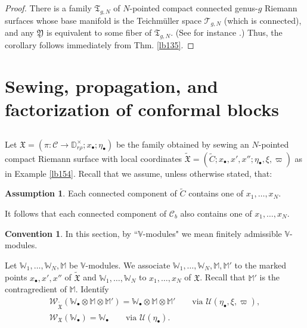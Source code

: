 \documentclass[12pt,a4paper,notitlepage]{article}
\theoremstyle{definition}
\newtheorem{ass}[df]{Assumption}
\newtheorem{cv}[df]{Convention}
\theoremstyle{plain}
\newcommand{\fk}{\mathfrak}
\newcommand{\mc}{\mathcal}
\newcommand{\wtd}{\widetilde}
\newcommand{\scr}{\mathscr}
\newcommand{\blt}{\bullet}
\newcommand{\Vbb}{\mathbb V}
\newcommand{\Wbb}{\mathbb W}
\newcommand{\Mbb}{\mathbb M}
\newcommand{\Dbb}{\mathbb D}
\numberwithin{equation}{section}
\begin{document}
\begin{proof}
There is a family $\fk T_{g,N}$ of $N$-pointed compact connected genus-$g$ Riemann surfaces whose base manifold is the Teichm\"uller space $\mc T_{g,N}$ (which is connected), and any $\fk Y$ is equivalent to some fiber of $\fk T_{g,N}$. (See for instance \cite[Chapter XV]{ACG}.) Thus, the corollary follows immediately from Thm. \ref{lb135}.
\end{proof}





\section{Sewing, propagation, and factorization of conformal blocks}




\subsection{}\label{lb169}

Let $\fk X=(\pi:\mc C\rightarrow\Dbb_{r\rho}^\times;x_\blt;\eta_\blt)$ be the family obtained by sewing an $N$-pointed compact Riemann surface with local coordinates $\wtd{\fk X}=(\wtd C;x_\blt,x',x'';\eta_\blt,\xi,\varpi)$ as in Example \ref{lb154}. Recall that we assume, unless otherwise stated, that:
\begin{ass}\label{lb157}
Each connected component of $\wtd C$ contains one of $x_1,\dots,x_N$.
\end{ass}
It follows that each connected component of $\mc C_b$ also contains one of $x_1,\dots,x_N$. 

\begin{cv}\label{lb175}
In this section, by ``$\Vbb$-modules" we mean finitely admissible $\Vbb$-modules. 
\end{cv}
Let $\Wbb_1,\dots,\Wbb_N,\Mbb$ be $\Vbb$-modules. We associate $\Wbb_1,\dots,\Wbb_N,\Mbb,\Mbb'$ to the marked points $x_\blt,x',x''$ of $\wtd{\fk X}$ and $\Wbb_1,\dots,\Wbb_N$ to $x_1,\dots,x_N$ of $\fk X$. Recall that $\Mbb'$ is the contragredient of $\Mbb$. Identify
\begin{gather*}
\scr W_{\wtd{\fk X}}(\Wbb_\blt\otimes\Mbb\otimes\Mbb')=\Wbb_\blt\otimes\Mbb\otimes\Mbb'\qquad\text{via }\mc U(\eta_\blt,\xi,\varpi),\\
\scr W_{\fk X}(\Wbb_\blt)=\Wbb_\blt\qquad\text{via }\mc U(\eta_\blt).
\end{gather*}
\end{document}
